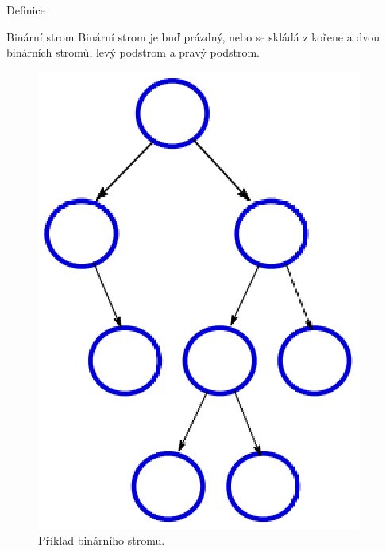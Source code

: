 \documentclass{beamer}
\begin{document}
\begin{frame}{Definice}
    \begin{block}{Binární strom}
        Binární strom je buď prázdný, nebo se skládá z kořene a dvou binárních stromů, levý podstrom a pravý podstrom.
    \end{block}
    \begin{figure}
        \centering
        \includegraphics[scale=0.5]{binarni_strom.eps}
        \caption{Příklad binárního stromu.}
    \end{figure}
\end{frame}
\end{document}
